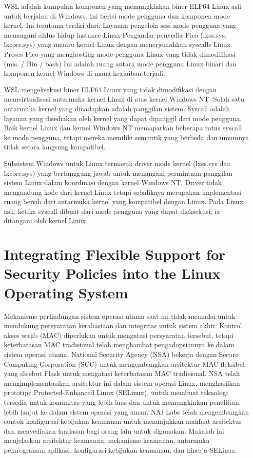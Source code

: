 \begin{enumeratae}
WSL adalah kumpulan komponen yang memungkinkan biner ELF64 Linux asli untuk berjalan di Windows. Ini berisi mode pengguna dan komponen mode kernel. Ini terutama terdiri dari:
Layanan pengelola sesi mode pengguna yang menangani siklus hidup instance Linux
Pengandar penyedia Pico (lxss.sys, lxcore.sys) yang meniru kernel Linux dengan menerjemahkan syscalls Linux
Proses Pico yang menghosting mode pengguna Linux yang tidak dimodifikasi (mis. / Bin / bash)
Ini adalah ruang antara mode pengguna Linux binari dan komponen kernel Windows di mana keajaiban terjadi.

WSL mengeksekusi biner ELF64 Linux yang tidak dimodifikasi dengan memvirtualisasi antarmuka kernel Linux di atas kernel Windows NT. Salah satu antarmuka kernel yang dihadapkan adalah panggilan sistem. Syscall adalah layanan yang disediakan oleh kernel yang dapat dipanggil dari mode pengguna. Baik kernel Linux dan kernel Windows NT memaparkan beberapa ratus syscall ke mode pengguna, tetapi mereka memiliki semantik yang berbeda dan umumnya tidak secara langsung kompatibel.

Subsistem Windows untuk Linux termasuk driver mode kernel (lxss.sys dan lxcore.sys) yang bertanggung jawab untuk menangani permintaan panggilan sistem Linux dalam koordinasi dengan kernel Windows NT. Driver tidak mengandung kode dari kernel Linux tetapi sebaliknya merupakan implementasi ruang bersih dari antarmuka kernel yang kompatibel dengan Linux. Pada Linux asli, ketika syscall dibuat dari mode pengguna yang dapat dieksekusi, ia ditangani oleh kernel Linux.

\section{Integrating Flexible Support for Security Policies into the Linux Operating System}
Mekanisme perlindungan sistem operasi utama saat ini tidak memadai untuk mendukung persyaratan kerahasiaan dan integritas untuk sistem akhir. Kontrol akses wajib (MAC) diperlukan untuk mengatasi persyaratan tersebut, tetapi keterbatasan MAC tradisional telah menghambat pengadopsiannya ke dalam sistem operasi utama. National Security Agency (NSA) bekerja dengan Secure Computing Corporation (SCC) untuk mengembangkan arsitektur MAC fleksibel yang disebut Flask untuk mengatasi keterbatasan MAC tradisional. NSA telah mengimplementasikan arsitektur ini dalam sistem operasi Linux, menghasilkan prototipe Protected-Enhanced Linux (SELinux), untuk membuat teknologi tersedia untuk komunitas yang lebih luas dan untuk memungkinkan penelitian lebih lanjut ke dalam sistem operasi yang aman. NAI Labs telah mengembangkan contoh konfigurasi kebijakan keamanan untuk menunjukkan manfaat arsitektur dan menyediakan landasan bagi orang lain untuk digunakan. Makalah ini menjelaskan arsitektur keamanan, mekanisme keamanan, antarmuka pemrograman aplikasi, konfigurasi kebijakan keamanan, dan kinerja SELinux.


\end{enumeratae}
